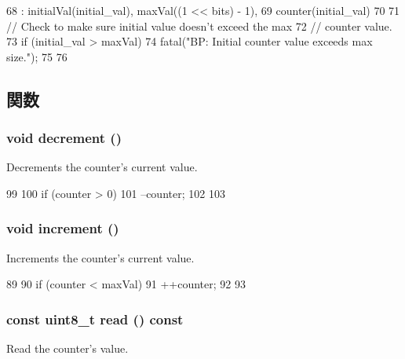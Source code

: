 \begin{DoxyCode}
68         : initialVal(initial_val), maxVal((1 << bits) - 1),
69           counter(initial_val)
70     {
71         // Check to make sure initial value doesn't exceed the max
72         // counter value.
73         if (initial_val > maxVal) {
74             fatal("BP: Initial counter value exceeds max size.");
75         }
76     }
\end{DoxyCode}


\subsection{関数}
\hypertarget{classSatCounter_af998f1201f6ff5160003144e5818b8ba}{
\subsubsection[{decrement}]{\setlength{\rightskip}{0pt plus 5cm}void decrement ()}}
\label{classSatCounter_af998f1201f6ff5160003144e5818b8ba}
Decrements the counter's current value. 


\begin{DoxyCode}
99     {
100         if (counter > 0) {
101             --counter;
102         }
103     }
\end{DoxyCode}
\hypertarget{classSatCounter_aeb2624c7a86b765725fd80cd426e147d}{
\subsubsection[{increment}]{\setlength{\rightskip}{0pt plus 5cm}void increment ()}}
\label{classSatCounter_aeb2624c7a86b765725fd80cd426e147d}
Increments the counter's current value. 


\begin{DoxyCode}
89     {
90         if (counter < maxVal) {
91             ++counter;
92         }
93     }
\end{DoxyCode}
\hypertarget{classSatCounter_a3f7adb392ec312df48dac5e14bb966be}{
\subsubsection[{read}]{\setlength{\rightskip}{0pt plus 5cm}const uint8\_\-t read () const}}
\label{classSatCounter_a3f7adb392ec312df48dac5e14bb966be}
Read the counter's value. 


